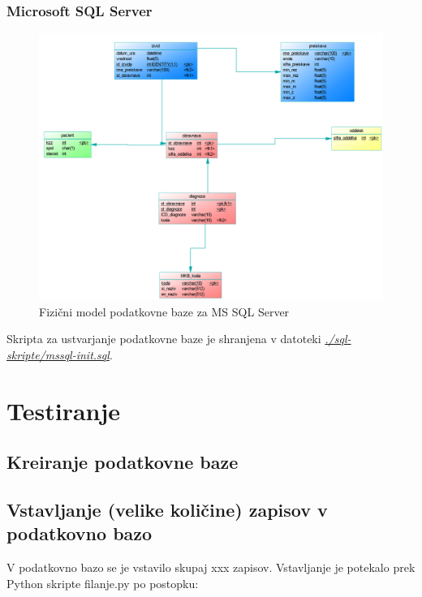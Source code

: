 \documentclass[a4paper,11pt]{report}
\begin{document}
\subsection{Microsoft SQL Server}
\begin{figure}[htb]
   \noindent\includegraphics[width=\linewidth]{./pics/fizicni-mssql.png}
   \caption{Fizični model podatkovne baze za MS SQL Server}
\end{figure}
Skripta za ustvarjanje podatkovne baze je shranjena v datoteki \textit{\underline{./sql-skripte/mssql-init.sql}}.

\chapter{Testiranje}

\section{Kreiranje podatkovne baze}

\section{Vstavljanje (velike količine) zapisov v podatkovno bazo}

V podatkovno bazo se je vstavilo skupaj xxx zapisov. Vstavljanje je potekalo prek Python skripte filanje.py po postopku: 
\end{document}
